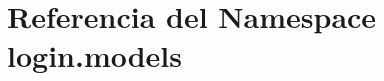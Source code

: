 \hypertarget{namespacelogin_1_1models}{}\section{Referencia del Namespace login.\+models}
\label{namespacelogin_1_1models}
